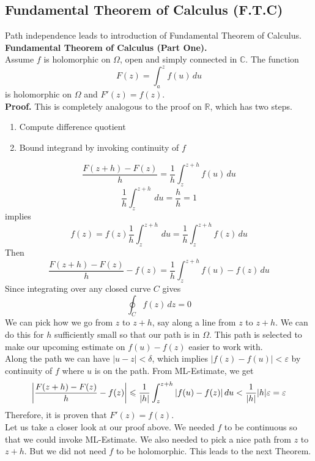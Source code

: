 \documentclass[11pt]{article}
\newcommand*\circled[1]{\tikz[baseline=(char.base)]{
            \node[shape=circle,draw,inner sep=2pt] (char) {#1};}}
\DeclarePairedDelimiter\abs{\lvert}{\rvert}
\begin{document}
\subsection{Fundamental Theorem of Calculus (F.T.C)} 
Path independence leads to introduction of Fundamental Theorem of Calculus. \\
\newline
\textbf{Fundamental Theorem of Calculus (Part One).} \\
Assume $f$ is holomorphic on $\Omega$, open and simply connected in $\mathbb{C}$. The function 
$$F(z) = \int_a^z f(u) \,du$$
is holomorphic on $\Omega$ and $F'(z) = f(z)$. \\
\textbf{Proof.} This is completely analogous to the proof on $\mathbb{R}$, which has two steps.
\begin{enumerate}
\item Compute difference quotient 
\item Bound integrand by invoking continuity of $f$ 
\end{enumerate}
\circled{\scriptsize1}
\begin{equation*}
\frac{F(z+h) - F(z)}{h} = \frac{1}{h}\int_z^{z+h} f(u) \,du 
\end{equation*}
$$\frac{1}{h}\int_z^{z+h}\,du = \frac{h}{h} = 1$$
implies
$$f(z) = f(z)\frac{1}{h}\int_z^{z+h}\,du = \frac{1}{h}\int_z^{z+h}f(z) \,du$$
Then 
$$\frac{F(z+h) - F(z)}{h} - f(z) = \frac{1}{h}\int_z^{z+h}f(u) - f(z) \,du$$
\circled{\scriptsize2} Since integrating over any closed curve $C$ gives 
$$\oint_C f(z) \,dz = 0$$
We can pick how we go from $z$ to $z +h$, say along a line from $z$ to $z + h$. We can do this for $h$ sufficiently small so that our path is in $\Omega$. This path is selected to make our upcoming estimate on $f(u) - f(z)$ easier to work with. \\
Along the path we can have $|u - z| < \delta$, which implies $|f(z) - f(u)| < \varepsilon$ by continuity of $f$ where $u$ is on the path. From ML-Estimate, we get 
$$\abs*{\frac{F(z+h) - F(z)}{h} - f(z)} \leqslant \frac{1}{|h|}\int_z^{z+h}|f(u) - f(z)|\,du < \frac{1}{|h|}|h|\varepsilon = \varepsilon$$
Therefore, it is proven that $F'(z) = f(z)$. \\
\newline
Let us take a closer look at our proof above. We needed $f$ to be continuous so that we could invoke ML-Estimate. We also needed to pick a nice path from $z$ to $z + h$. But we did not need $f$ to be holomorphic. This leads to the next Theorem. \\
\end{document}
